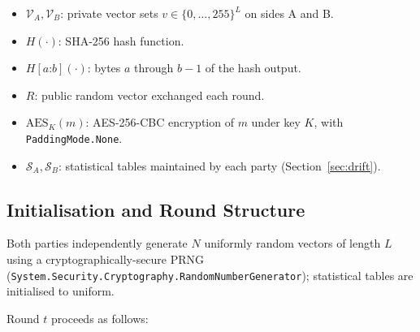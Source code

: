 \documentclass[11pt,a4paper]{article}
\begin{document}
\begin{itemize}[leftmargin=*]
\item $\mathcal{V}_A, \mathcal{V}_B$: private vector sets $v \in \{0,\ldots,255\}^L$ on sides A and B.
\item $H(\cdot)$: SHA-256 hash function.
\item $H[a\mathord{:}b](\cdot)$: bytes $a$ through $b-1$ of the hash output.
\item $R$: public random vector exchanged each round.
\item $\mathrm{AES}_{K}(m)$: AES-256-CBC encryption of $m$ under key $K$, with \texttt{PaddingMode.None}.
\item $\mathcal{S}_A, \mathcal{S}_B$: statistical tables maintained by each party (Section~\ref{sec:drift}).
\end{itemize}

\subsection{Initialisation and Round Structure}

Both parties independently generate $N$ uniformly random vectors of length $L$ using a cryptographically-secure PRNG (\texttt{System.Security.Cryptography.RandomNumberGenerator}); statistical tables are initialised to uniform.

Round $t$ proceeds as follows:
\end{document}

